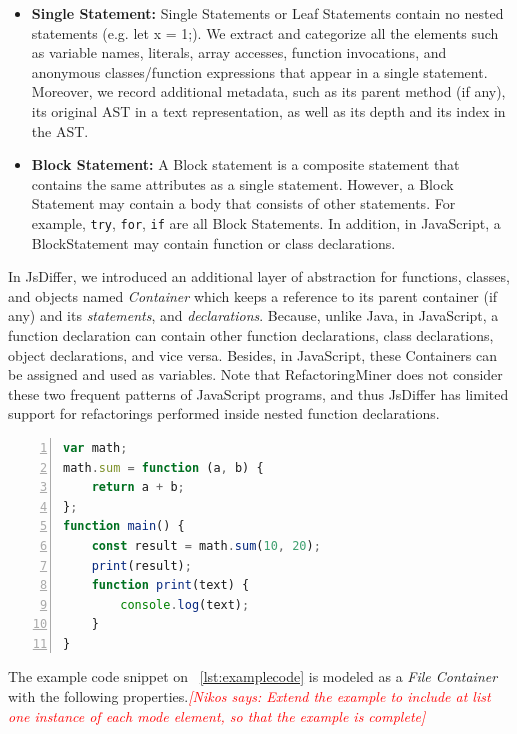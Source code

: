 \documentclass[letterpaper,12pt,onecolumn,final]{report}
\newcommand{\nikos}[1]{\textcolor{red}{{\it [Nikos says: #1]}}}
\begin{document}
\begin{itemize}
\item \textbf{Single Statement:}
Single Statements or Leaf Statements contain no nested statements (e.g. let x = 1;). We extract and categorize all the elements such as variable names, literals, array accesses, function invocations, and anonymous classes/function expressions that appear in a single statement. Moreover, we record additional metadata, such as its parent method (if any), its original AST in a text representation, as well as its depth and its index in the AST.

\item  \textbf{Block Statement:}
A Block statement is a composite statement that contains the same attributes as a single statement. However, a Block Statement may contain a body that consists of other statements. For example, \texttt{try}, \texttt{for}, \texttt{if} are all Block Statements. In addition, in JavaScript, a BlockStatement may contain function or class declarations.
\end{itemize}

In JsDiffer, we introduced an additional layer of abstraction for functions, classes, and objects named \textit{Container} which keeps a reference to its parent container (if any) and its \textit{statements}, and \textit{declarations}. Because, unlike Java, in JavaScript, a function declaration can contain other function declarations, class declarations, object declarations, and vice versa. Besides, in JavaScript, these Containers can be assigned and used as variables. Note that RefactoringMiner does not consider these two frequent patterns of JavaScript programs, and thus JsDiffer has limited support for refactorings performed inside nested function declarations.



\begin{lstlisting}[language=JavaScript, caption=Example JavaScript Code Snippet, numbers=left, label={lst:examplecode}]
var math;
math.sum = function (a, b) {
    return a + b;
};
function main() {
    const result = math.sum(10, 20);
    print(result);
    function print(text) {
        console.log(text);
    }
}
\end{lstlisting}

The example code snippet on ~\ref{lst:examplecode} is modeled as a \textit{File Container} with the following properties.\nikos{Extend the example to include at list one instance of each mode element, so that the example is complete}
\end{document}
